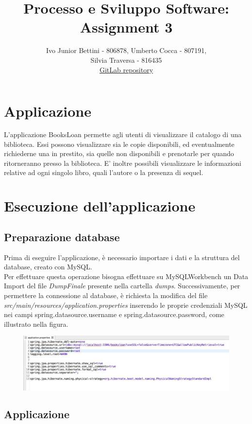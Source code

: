 \documentclass[a4paper,10pt]{article}
\title{Processo e Sviluppo Software: Assignment 3}
\author{Ivo Junior Bettini - 806878, Umberto Cocca - 807191, \\Silvia Traversa - 816435\\
\href{https://gitlab.com/s.traversa/2019_assignment3_booksloan}{GitLab repository}}
\date{}
\begin{document}
\maketitle 

\section*{Applicazione}
L'applicazione BooksLoan permette agli utenti di visualizzare il catalogo di una biblioteca. Essi possono visualizzare sia le copie disponibili, ed eventualmente richiederne una in prestito, sia quelle non disponibili e prenotarle per quando ritorneranno presso la biblioteca.
E' inoltre possibili visualizzare le informazioni relative ad ogni singolo libro, quali l'autore o la presenza di sequel. 

\section*{Esecuzione dell'applicazione}
\subsection*{Preparazione database}
Prima di eseguire l'applicazione, è necessario importare i dati e la struttura del database, creato con MySQL.\\
Per effettuare questa operazione bisogna effettuare su MySQLWorkbench un Data Import del file \textit{DumpFinale} presente nella cartella \textit{dumps}. Successivamente, per permettere la connessione al database, è richiesta la modifica del file \textit{src/main/resources/application.properties} inserendo le proprie credenziali MySQL nei campi spring.datasource.username e spring.datasource.password, come illustrato nella figura.\\
\begin{figure}[H]
	\centering
	\includegraphics[width=1\linewidth]{images/properties}
\end{figure}

\subsection*{Applicazione}
\end{document}
